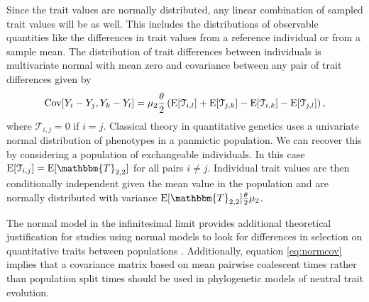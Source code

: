 Since the trait values are normally distributed, any linear combination of
sampled trait values will be as well. This includes the distributions of
observable quantities like the differences in trait values from a reference
individual or from a sample mean. The distribution of trait differences between
individuals is multivariate normal with mean zero and covariance between any
pair of trait differences given by
\begin{equation}
  \label{eq:normcov}
  \mathrm{Cov}[Y_i-Y_j,Y_k-Y_l] = \mu_  2\frac{\theta}{2}\left( \mathrm{E}[\mathcal{T}_{i,l}] + \mathrm{E}[\mathcal{T}_{j,k}] -
                         \mathrm{E}[\mathcal{T}_{i,k}] - \mathrm{E}[\mathcal{T}_{j,l}] \right),
\end{equation}
where $\mathcal{T}_{i,j} = 0$ if $i = j$. Classical theory in quantitative
genetics uses a univariate normal distribution of phenotypes in a panmictic
population. We can recover this by considering a population of exchangeable
individuals. In this case $\E[\mathcal{T}_{i,j}] = \E[\mathbbm{T}_{2,2}]$ for all pairs
$i \neq j$. Individual trait values are then conditionally independent given the
mean value in the population and are normally distributed with variance
$\E[\mathbbm{T}_{2,2}]\T\mu_2$.

The normal model in the infinitesimal limit provides additional theoretical
justification for studies using normal models to look for differences in
selection on quantitative traits between populations
\citep{Ovaskainen2011,Praebel2013,Robinson2015}. Additionally, equation
\eqref{eq:normcov} implies that a covariance matrix based on mean pairwise
coalescent times rather than population split times should be used in
phylogenetic models of neutral trait evolution.

 
